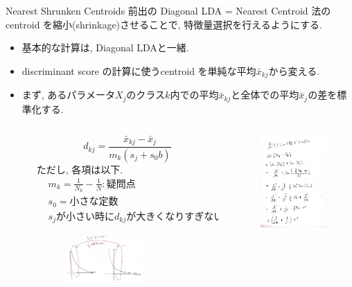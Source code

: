 \documentclass[dvipdfmx,8pt]{beamer}
\begin{document}
  \begin{frame}{Nearest Shrunken Centroids}
    前出の Diagonal LDA = Nearest Centroid 法の centroid を縮小(shrinkage)させることで, 特徴量選択を行えるようにする.
    \begin{itemize}
      \item 基本的な計算は, Diagonal LDAと一緒.
      \item discriminant score の計算に使うcentroid を単純な平均$\bar{x}_{kj}$から変える.
      \item まず, あるパラメータ$X_j$のクラス$k$内での平均$\bar{x}_{kj}$と全体での平均$\bar{x}_j$の差を標準化する.
        \begin{columns}[t]
          \begin{column}{0.05\columnwidth}
          \end{column}
          \begin{column}{0.6\columnwidth}
            \[
              d_{kj}=\frac{\bar{x}_{kj}-\bar{x}_j}{m_k(s_j+s_0b)}
            \]
            ただし, 各項は以下.
            \begin{align*}
              &m_k=\frac{1}{N_k}-\frac{1}{N}\colon \mbox{疑問点}\\
              &s_0=\mbox{小さな定数}\\
              &s_j\mbox{が小さい時に}d_{kj}\mbox{が大きくなりすぎないように}
            \end{align*}
            \begin{figure}
              \centering
              \includegraphics[width=3cm]{./images/nsc-normalization.jpg}
            \end{figure}
          \end{column}
          \begin{column}{0.35\columnwidth}
            \begin{figure}[htb]
              \centering
              \includegraphics[width=3.5cm]{./images/nsc-variance-calc.jpg}
            \end{figure}
          \end{column}
        \end{columns}
    \end{itemize}
  \end{frame}
\end{document}
